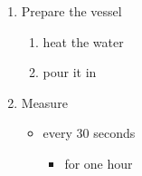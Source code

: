 \begin{enumerate}
    \item Prepare the vessel
    \begin{enumerate}
        \item heat the water
        \item pour it in
    \end{enumerate}
    \item Measure
    \begin{itemize}
        \item every 30 seconds
        \begin{itemize}
            \item for one hour
        \end{itemize}
    \end{itemize}
\end{enumerate}
